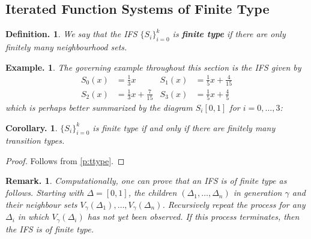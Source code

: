 \documentclass[11pt, a4paper]{memoir}
\theoremstyle{change}
\newtheorem{corollary}[theorem]{Corollary.}
\theoremstyle{plain}
\theoremstyle{nonumberplain}
\newtheorem{definition}{Definition.}
\newtheorem{example}{Example.}
\newtheorem{remark}{Remark.}
\newtheorem{proof}{Proof}
\numberwithin{equation}{section}
\begin{document}
\subsection{Iterated Function Systems of Finite Type}
\begin{definition}
    We say that the IFS $\{S_i\}_{i=0}^k$ is \textbf{finite type} if there are only finitely many neighbourhood sets.
\end{definition}
\begin{example}
    The governing example throughout this section is the IFS given by
    \begin{align*}
        S_0(x)&=\frac{1}{3}x & S_1(x) &= \frac{1}{5}x+\frac{4}{15}\\
        S_2(x) &= \frac{1}{3}x+\frac{7}{15} & S_3(x) &= \frac{1}{5}x+\frac{4}{5}
    \end{align*}
    which is perhaps better summarized by the diagram $S_i[0,1]$ for $i=0,\ldots,3$:
    \begin{center}
    \end{center}
\end{example}
\begin{corollary}
    $\{S_i\}_{i=0}^k$ is finite type if and only if there are finitely many transition types.
\end{corollary}
\begin{proof}
    Follows from \cref{p:ttype}.
\end{proof}
\begin{remark}
    Computationally, one can prove that an IFS is of finite type as follows.
    Starting with $\Delta=[0,1]$, the children $(\Delta_1,\ldots,\Delta_n)$ in generation $\gamma$ and their neighbour sets $V_\gamma(\Delta_1),\ldots,V_\gamma(\Delta_n)$.
    Recursively repeat the process for any $\Delta_i$ in which $V_\gamma(\Delta_i)$ has not yet been observed.
    If this process terminates, then the IFS is of finite type.
\end{remark}
\end{document}
